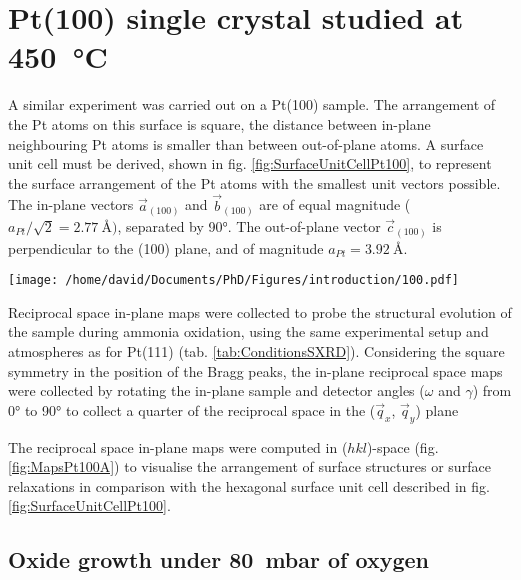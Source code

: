 \section{Pt(100) single crystal studied at \qty{450}{\degreeCelsius}} \label{sec:SXRD100}

A similar experiment was carried out on a Pt(100) sample.
The arrangement of the Pt atoms on this surface is square, the distance between in-plane neighbouring Pt atoms is smaller than between out-of-plane atoms.
A surface unit cell must be derived, shown in fig. \ref{fig:SurfaceUnitCellPt100}, to represent the surface arrangement of the Pt atoms with the smallest unit vectors possible.
The in-plane vectors $\vec{a}_{(100)}$ and $\vec{b}_{(100)}$ are of equal magnitude ($a_{Pt} / \sqrt{2} = \qty{2.77}{\angstrom})$, separated by \ang{90}.
The out-of-plane vector $\vec{c}_{(100)}$ is perpendicular to the (100) plane, and of magnitude $a_{Pt} = \qty{3.92}{\angstrom}$.

\begin{SCfigure}
    \centering
    \texttt{[image: /home/david/Documents/PhD/Figures/introduction/100.pdf]}
    \caption{
        Face-entered cubic unit cell of Pt with $(100)$ crystallographic plane drawn in green.
        $\vec{a}_{(100)}$, $\vec{b}_{(100)}$ and $\vec{c}_{(100)}$ are the $(100)$ surface unit cell vectors.
    }
    \label{fig:SurfaceUnitCellPt100}
\end{SCfigure}

Reciprocal space in-plane maps were collected to probe the structural evolution of the sample during ammonia oxidation, using the same experimental setup and atmospheres as for Pt(111) (tab. \ref{tab:ConditionsSXRD}).
Considering the square symmetry in the position of the Bragg peaks, the in-plane reciprocal space maps were collected by rotating the in-plane sample and detector angles ($\omega$ and $\gamma$) from \ang{0} to \ang{90} to collect a quarter of the reciprocal space in the ($\vec{q}_x$, $\vec{q}_y$) plane

The reciprocal space in-plane maps were computed in ($hkl$)-space (fig. \ref{fig:MapsPt100A}) to visualise the arrangement of surface structures or surface relaxations in comparison with the hexagonal surface unit cell described in fig. \ref{fig:SurfaceUnitCellPt100}.

\subsection{Oxide growth under \qty{80}{\milli\bar} of oxygen}

